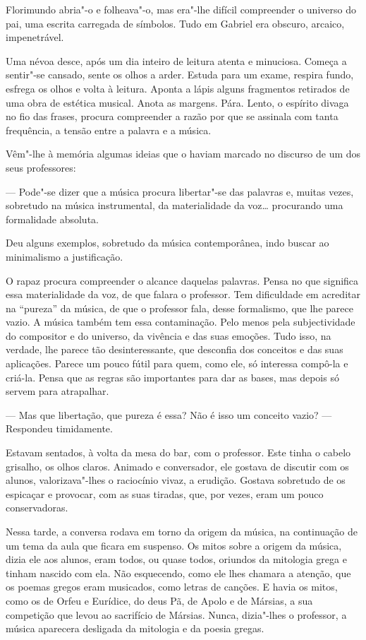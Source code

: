 Florimundo abria"-o e folheava"-o, mas era"-lhe difícil compreender o
universo do pai, uma escrita carregada de símbolos. Tudo em Gabriel era
obscuro, arcaico, impenetrável.

Uma névoa desce, após um dia inteiro de leitura atenta e minuciosa.
Começa a sentir"-se cansado, sente os olhos a arder. Estuda para um
exame, respira fundo, esfrega os olhos e volta à leitura. Aponta a lápis
alguns fragmentos retirados de uma obra de estética musical. Anota as
margens. Pára. Lento, o espírito divaga no fio das frases, procura
compreender a razão por que se assinala com tanta frequência, a tensão
entre a palavra e a música.

Vêm"-lhe à memória algumas ideias que o haviam marcado no discurso de um
dos seus professores:

--- Pode"-se dizer que a música procura libertar"-se das palavras e, muitas
vezes, sobretudo na música instrumental, da materialidade da voz\ldots{}
procurando uma formalidade absoluta.

Deu alguns exemplos, sobretudo da música contemporânea, indo buscar ao
minimalismo a justificação.

O rapaz procura compreender o alcance daquelas palavras. Pensa no que
significa essa materialidade da voz, de que falara o professor. Tem
dificuldade em acreditar na ``pureza'' da música, de que o professor
fala, desse formalismo, que lhe parece vazio. A música também tem essa
contaminação. Pelo menos pela subjectividade do compositor e do
universo, da vivência e das suas emoções. Tudo isso, na verdade, lhe
parece tão desinteressante, que desconfia dos conceitos e das suas
aplicações. Parece um pouco fútil para quem, como ele, só interessa
compô-la e criá-la. Pensa que as regras são importantes para dar as
bases, mas depois só servem para atrapalhar.

--- Mas que libertação, que pureza é essa? Não é isso um conceito vazio?
--- Respondeu timidamente.

Estavam sentados, à volta da mesa do bar, com o professor. Este tinha o
cabelo grisalho, os olhos claros. Animado e conversador, ele gostava de
discutir com os alunos, valorizava"-lhes o raciocínio vivaz, a erudição.
Gostava sobretudo de os espicaçar e provocar, com as suas tiradas, que,
por vezes, eram um pouco conservadoras.

Nessa tarde, a conversa rodava em torno da origem da música, na
continuação de um tema da aula que ficara em suspenso. Os mitos sobre a
origem da música, dizia ele aos alunos, eram todos, ou quase todos,
oriundos da mitologia grega e tinham nascido com ela. Não esquecendo,
como ele lhes chamara a atenção, que os poemas gregos eram musicados,
como letras de canções. E havia os mitos, como os de Orfeu e Eurídice,
do deus Pã, de Apolo e de Mársias, a sua competição que levou ao
sacrifício de Mársias. Nunca, dizia"-lhes o professor, a música aparecera
desligada da mitologia e da poesia gregas.

